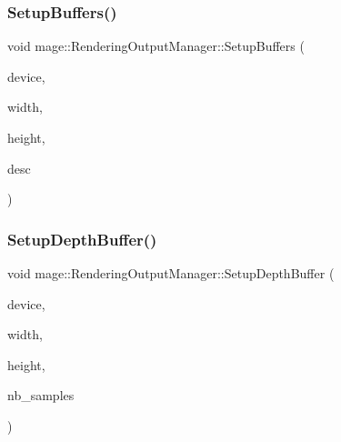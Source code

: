 \hypertarget{classmage_1_1_rendering_output_manager_a380fd0b2507a438c3750b7654f6ebc14}{}\label{classmage_1_1_rendering_output_manager_a380fd0b2507a438c3750b7654f6ebc14} 
\subsubsection{\texorpdfstring{Setup\+Buffers()}{SetupBuffers()}}
{\footnotesize\ttfamily void mage\+::\+Rendering\+Output\+Manager\+::\+Setup\+Buffers (\begin{DoxyParamCaption}\item[{I\+D3\+D11\+Device2 $\ast$}]{device,  }\item[{\hyperlink{namespacemage_a41c104c036fba3756a74e19f793eeaa1}{U32}}]{width,  }\item[{\hyperlink{namespacemage_a41c104c036fba3756a74e19f793eeaa1}{U32}}]{height,  }\item[{\hyperlink{namespacemage_a86cd40b8f2f42ca4d616cc6ec665a7f2}{A\+A\+Descriptor}}]{desc }\end{DoxyParamCaption})\hspace{0.3cm}{\ttfamily [private]}}

\hypertarget{classmage_1_1_rendering_output_manager_a187d2f6e5a6c4b83598689fa41b28ba0}{}\label{classmage_1_1_rendering_output_manager_a187d2f6e5a6c4b83598689fa41b28ba0} 
\subsubsection{\texorpdfstring{Setup\+Depth\+Buffer()}{SetupDepthBuffer()}}
{\footnotesize\ttfamily void mage\+::\+Rendering\+Output\+Manager\+::\+Setup\+Depth\+Buffer (\begin{DoxyParamCaption}\item[{I\+D3\+D11\+Device2 $\ast$}]{device,  }\item[{\hyperlink{namespacemage_a41c104c036fba3756a74e19f793eeaa1}{U32}}]{width,  }\item[{\hyperlink{namespacemage_a41c104c036fba3756a74e19f793eeaa1}{U32}}]{height,  }\item[{\hyperlink{namespacemage_a41c104c036fba3756a74e19f793eeaa1}{U32}}]{nb\+\_\+samples }\end{DoxyParamCaption})\hspace{0.3cm}{\ttfamily [private]}}



